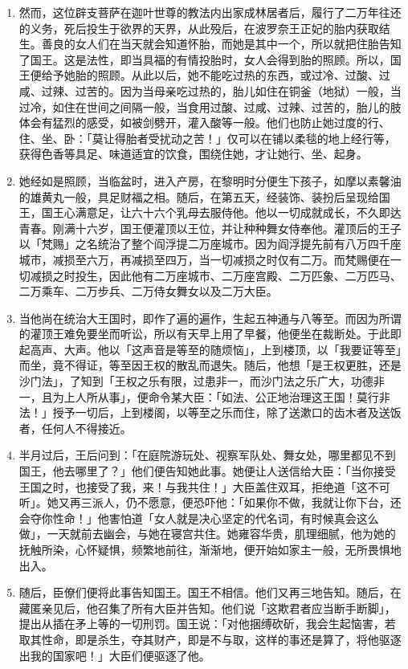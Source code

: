 \begin{enumerate}
\item 然而，这位辟支菩萨在迦叶世尊的教法内出家成林居者后，履行了二万年往还的义务，死后投生于欲界的天界，从此殁后，在波罗奈王正妃的胎内获取结生。善良的女人们在当天就会知道怀胎，而她是其中一个，所以就把住胎告知了国王。这是法性，即当具福的有情投胎时，女人会得到胎的照顾。所以，国王便给予她胎的照顾。从此以后，她不能吃过热的东西，或过冷、过酸、过咸、过辣、过苦的。因为当母亲吃过热的，胎儿如住在铜釜（地狱）一般，当过冷，如住在世间之间隔一般，当食用过酸、过咸、过辣、过苦的，胎儿的肢体会有猛烈的感受，如被剑劈开，灌入酸等一般。他们也防止她过度的行、住、坐、卧：「莫让得胎者受扰动之苦！」仅可以在铺以柔毯的地上经行等，获得色香等具足、味道适宜的饮食，围绕住她，才让她行、坐、起身。
\item 她经如是照顾，当临盆时，进入产房，在黎明时分便生下孩子，如摩以素馨油的雄黄丸一般，具足财福之相。随后，在第五天，经装饰、装扮后呈现给国王，国王心满意足，让六十六个乳母去服侍他。他以一切成就成长，不久即达青春。刚满十六岁，国王便灌顶以王位，并让种种舞女侍奉他。灌顶后的王子以「梵赐」之名统治了整个阎浮提二万座城市。因为阎浮提先前有八万四千座城市，减损至六万，再减损至四万，当一切减损之时仅有二万。而梵赐便在一切减损之时投生，因此他有二万座城市、二万座宫殿、二万匹象、二万匹马、二万乘车、二万步兵、二万侍女舞女以及二万大臣。
\item 当他尚在统治大王国时，即作了遍的遍作，生起五神通与八等至。而因为所谓的灌顶王难免要坐而听讼，所以有天早上用了早餐，他便坐在裁断处。于此即起高声、大声。他以「这声音是等至的随烦恼」，上到楼顶，以「我要证等至」而坐，竟不得证，等至因王权的散乱而退失。随后，他想「是王权更胜，还是沙门法」，了知到「王权之乐有限，过患非一，而沙门法之乐广大，功德非一，且为上人所从事」，便命令某大臣：「如法、公正地治理这王国！莫行非法！」授予一切后，上到楼阁，以等至之乐而住，除了送漱口的齿木者及送饭者，任何人不得接近。
\item 半月过后，王后问到：「在庭院游玩处、视察军队处、舞女处，哪里都见不到国王，他去哪里了？」他们便告知她此事。她便让人送信给大臣：「当你接受王国之时，也接受了我，来！与我共住！」大臣盖住双耳，拒绝道「这不可听」。她又再三派人，仍不愿意，便恐吓他：「如果你不做，我就让你下台，还会夺你性命！」他害怕道「女人就是决心坚定的代名词，有时候真会这么做」，一天就前去幽会，与她在寝宫共住。她雍容华贵，肌理细腻，他为她的抚触所染，心怀疑惧，频繁地前往，渐渐地，便开始如家主一般，无所畏惧地出入。
\item 随后，臣僚们便将此事告知国王。国王不相信。他们又再三地告知。随后，在藏匿亲见后，他召集了所有大臣并告知。他们说「这欺君者应当断手断脚」，提出从插在矛上等的一切刑罚。国王说：「对他捆缚砍斫，我会生起恼害，若取其性命，即是杀生，夺其财产，即是不与取，这样的事还是算了，将他驱逐出我的国家吧！」大臣们便驱逐了他。

\end{enumerate}
